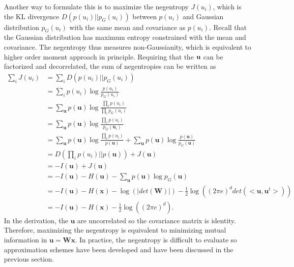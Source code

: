 \documentclass[aps,prl,preprint,superscriptaddress]{revtex4-2}
\begin{document}
Another way to formulate this is to maximize the negentropy $J(u_{i})$, which is the KL divergence $D(p(u_{i})||p_{G}(u_{i}))$ between $p(u_{i})$ and Gaussian distribution $p_{G}(u_{i})$ with the same mean and covariance as $p(u_{i})$. Recall that the Gaussian distribution has maximum entropy constrained with the mean and covariance. The negentropy thus measures non-Gaussianity, which is equivalent to higher order moment approach in principle. Requiring that the $\bf{u}$ can be factorized and decorrelated, the sum of negentropies can be written as 
\begin{align}
\sum_{i}J(u_{i}) &= \sum_{i}D(p(u_{i})||p_{G}(u_{i})) \\
&= \sum_{i}p(u_{i})\log\frac{p(u_{i})}{p_{G}(u_{i})} \\
&= \sum_{\mathbf{u}}p(\mathbf{u}) \log\frac{\prod_{i}p(u_{i})}{\prod_{i}p_{G}(u_{i})} \\
&= \sum_{\mathbf{u}}p(\mathbf{u}) \log\frac{\prod_{i}p(u_{i})}{p_{G}(\mathbf{u}_{i})} \\
&= \sum_{\mathbf{u}}p(\mathbf{u}) \log\frac{\prod_{i}p(u_{i})}{p(\mathbf{u})} + \sum_{\mathbf{u}}p(\mathbf{u})\log\frac{p(\mathbf{u})}{p_{G}(\mathbf{u})} \\
&= D(\prod_{i}p(u_{i})||p(\mathbf{u})) + J(\mathbf{u}) \\
&= -I(\mathbf{u}) + J(\mathbf{u}) \\
& = -I(\mathbf{u}) - H(\mathbf{u}) - \sum_{\mathbf{u}}p(\mathbf{u})\log p_{G}(\mathbf{u}) \\
& = -I(\mathbf{u}) - H(\mathbf{x}) - \log(|det(\mathbf{W})|) - \frac{1}{2}\log((2\pi e)^{d}det(<\mathbf{u}, \mathbf{u}^{t}>))\\
&= -I(\mathbf{u}) - H(\mathbf{x}) - \frac{1}{2}\log((2\pi e)^{d}).
\end{align} In the derivation, the $\mathbf{u}$ are uncorrelated so the covariance matrix is identity. Therefore, maximizing the negentropy is equivalent to minimizing mutual information in $\mathbf{u} = \mathbf{W}\mathbf{x}$. In practice, the negentropy is difficult to evaluate so approximation schemes have been developed and have been discussed in the previous section. 
\end{document}
